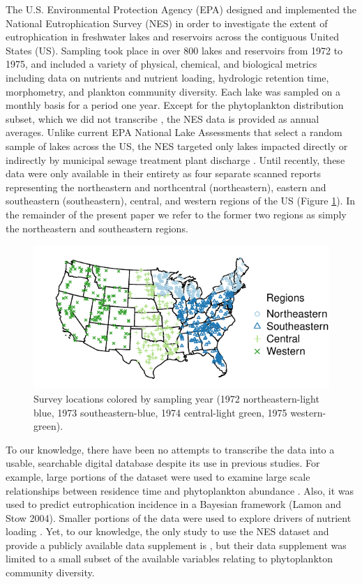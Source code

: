 \documentclass[journal abbreviations, manuscript]{copernicus}
\begin{document}
The U.S. Environmental Protection Agency (EPA) designed and implemented the National Eutrophication Survey (NES) in order to investigate the extent of eutrophication in freshwater lakes and reservoirs across the contiguous United States (US). Sampling took place in over 800 lakes and reservoirs from 1972 to 1975, and included a variety of physical, chemical, and biological metrics including data on nutrients and nutrient loading, hydrologic retention time, morphometry, and plankton community diversity. Each lake was sampled on a monthly basis for a period one year. Except for the phytoplankton distribution subset, which we did not transcribe \citep[see ][]{stomp2011large}, the NES data is provided as annual averages. Unlike current EPA National Lake Assessments that select a random sample of lakes across the US, the NES  targeted only lakes impacted directly or indirectly by municipal sewage treatment plant discharge \citep{nla-methods, nes-methods}. Until recently, these data were only available in their entirety as four separate scanned reports representing the northeastern and northcentral  (northeastern), eastern and southeastern (southeastern), central, and western regions of the US (Figure \ref{fig:points_regions}). In the remainder of the present paper we refer to the former two regions as simply the northeastern and southeastern regions.

\begin{figure}[t]
  \includegraphics[width=12cm]{points_regions-crop.pdf}
  \caption{Survey locations colored by sampling year (1972 northeastern-light blue, 1973 southeastern-blue, 1974 central-light green, 1975 western-green).}\label{fig:points_regions}
\end{figure}

To our knowledge, there have been no attempts to transcribe the data into a usable, searchable digital database despite its use in previous studies.   For example, large portions of the dataset were used to examine large scale relationships between residence time and phytoplankton abundance \citep{soballe1987large}. Also, it was used to predict eutrophication incidence in a Bayesian framework (Lamon and Stow 2004). Smaller portions of the data were used to explore drivers of nutrient loading \citep{stomp2011large,Brettreviewreassessmentlake2007}. Yet, to our knowledge, the only study to use the NES dataset and provide a publicly available data supplement is \citet{stomp2011large}, but their data supplement was limited to a small subset of the available variables relating to phytoplankton community diversity. 
\end{document}
